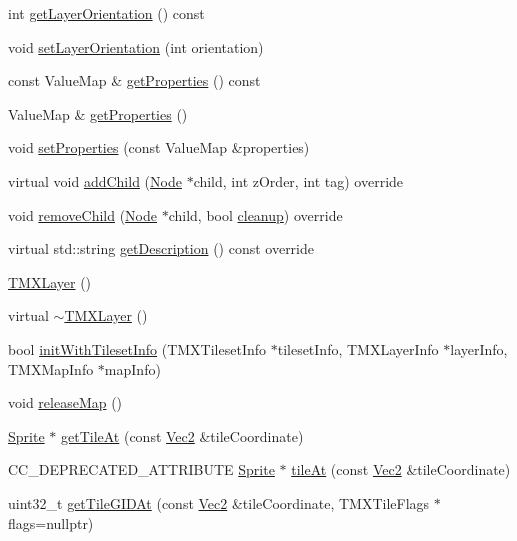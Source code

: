 \begin{DoxyCompactItemize}
\item 
int \hyperlink{classTMXLayer_af461c95bbedda35e396ae3c7cc3d38f7}{get\+Layer\+Orientation} () const
\item 
void \hyperlink{classTMXLayer_a0de2d7f74cf0563ab0c6f9f0de28c3aa}{set\+Layer\+Orientation} (int orientation)
\item 
const Value\+Map \& \hyperlink{classTMXLayer_aec0bca7dba4d5e454cf7b688388c2f5f}{get\+Properties} () const
\item 
Value\+Map \& \hyperlink{classTMXLayer_a48fdd277ced00a92a6d1ebd26a02fb11}{get\+Properties} ()
\item 
void \hyperlink{classTMXLayer_ac7368336ee0929ac575119db824a6362}{set\+Properties} (const Value\+Map \&properties)
\item 
virtual void \hyperlink{classTMXLayer_a8f537dd4690c31ee1a61413c9bfcaa94}{add\+Child} (\hyperlink{classNode}{Node} $\ast$child, int z\+Order, int tag) override
\item 
void \hyperlink{classTMXLayer_abaf25490e1f7807816c07167a8d4af46}{remove\+Child} (\hyperlink{classNode}{Node} $\ast$child, bool \hyperlink{classNode_aa2de84c6cdeec9cd647d236c30ee0567}{cleanup}) override
\item 
virtual std\+::string \hyperlink{classTMXLayer_ae03bc92e2f95a1c6cfce363a8abcfd77}{get\+Description} () const override
\item 
\hyperlink{classTMXLayer_a24b45a43f69749ee9c63e94eb0bcad96}{T\+M\+X\+Layer} ()
\item 
virtual \hyperlink{classTMXLayer_aec7c2f13f8d00d62e01adbc7eb4c8c44}{$\sim$\+T\+M\+X\+Layer} ()
\item 
bool \hyperlink{classTMXLayer_abc5373b13dff0e9f01697f46783eaff8}{init\+With\+Tileset\+Info} (T\+M\+X\+Tileset\+Info $\ast$tileset\+Info, T\+M\+X\+Layer\+Info $\ast$layer\+Info, T\+M\+X\+Map\+Info $\ast$map\+Info)
\item 
void \hyperlink{classTMXLayer_a45ad4c67a9ea4e2f2ce3d6d6228e5402}{release\+Map} ()
\item 
\hyperlink{classSprite}{Sprite} $\ast$ \hyperlink{classTMXLayer_ad8a1eaf52658b06dead572393bf2b386}{get\+Tile\+At} (const \hyperlink{classVec2}{Vec2} \&tile\+Coordinate)
\item 
C\+C\+\_\+\+D\+E\+P\+R\+E\+C\+A\+T\+E\+D\+\_\+\+A\+T\+T\+R\+I\+B\+U\+TE \hyperlink{classSprite}{Sprite} $\ast$ \hyperlink{classTMXLayer_a2258360648a3e91a3dccb4f52ffad8f1}{tile\+At} (const \hyperlink{classVec2}{Vec2} \&tile\+Coordinate)
\item 
uint32\+\_\+t \hyperlink{classTMXLayer_a0a3f3e283a4a654aae4e4e4761e386eb}{get\+Tile\+G\+I\+D\+At} (const \hyperlink{classVec2}{Vec2} \&tile\+Coordinate, T\+M\+X\+Tile\+Flags $\ast$flags=nullptr)

\end{DoxyCompactItemize}
